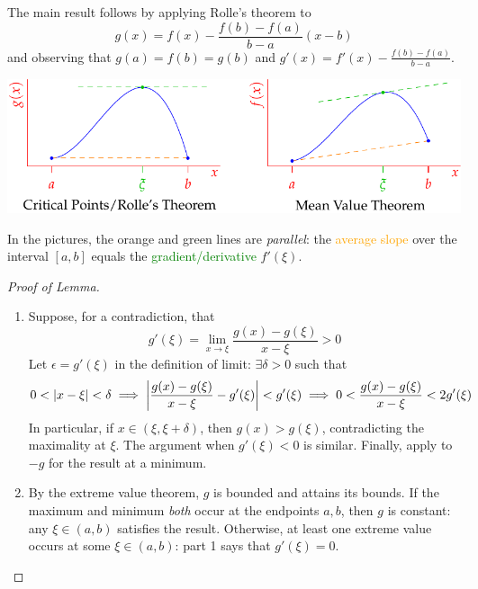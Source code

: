 The main result follows by applying Rolle's theorem to
\[g(x)=f(x)-\frac{f(b)-f(a)}{b-a}(x-b)\]
and observing that $g(a)=f(b)=g(b)$ and $g'(x)=f'(x)-\frac{f(b)-f(a)}{b-a}$.

\begin{center}
\includegraphics{mvt}
\end{center}

In the pictures, the orange and green lines are \emph{parallel}: the \textcolor{orange}{average slope} over the interval $[a,b]$ equals the \textcolor{Green}{gradient/derivative} $f'(\xi)$.

\begin{proof}[Proof of Lemma]
\begin{enumerate}\itemsep0pt
  \item Suppose, for a contradiction, that
	\[g'(\xi)=\lim_{x\to \xi}\frac{g(x)-g(\xi)}{x-\xi}>0\]
	Let $\epsilon=g'(\xi)$ in the definition of limit: $\exists\delta>0$ such that
	\[0<\left| x-\xi\right|<\delta\implies\left| \frac{g(x)-g(\xi)}{x-\xi}-g'(\xi)\right|<g'(\xi)\implies 0<\frac{g(x)-g(\xi)}{x-\xi}<2g'(\xi)\]
	In particular, if $x\in(\xi,\xi+\delta)$, then $g(x)>g(\xi)$, contradicting the maximality at $\xi$.\smallbreak
	The argument when $g'(\xi)<0$ is similar. Finally, apply to $-g$ for the result at a minimum.
  \item By the extreme value theorem, $g$ is bounded and attains its bounds.
  If the maximum and minimum \emph{both} occur at the endpoints $a,b$, then $g$ is constant: any $\xi\in(a,b)$ satisfies the result.
Otherwise, at least one extreme value occurs at some $\xi\in(a,b)$: part 1 says that $g'(\xi)=0$.\hfill\qedhere
\end{enumerate}
\end{proof}\goodbreak

